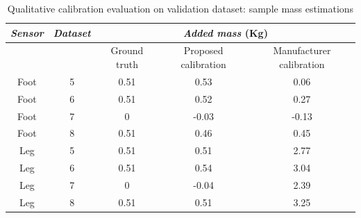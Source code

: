 \begin{table}[ht] 
\caption{Qualitative calibration evaluation on validation dataset: sample mass estimations}
\centering 
\begin{tabular}{ | c | c | c | c | c | } 
\hline
              \emph{Sensor}   & \emph{Dataset} & \multicolumn{3}{c|}{\emph{Added mass} (Kg)} \\
\hline \rowcolor[gray]{.9}
\hline \rowcolor[gray]{.9}    &                &  \multicolumn{1}{p{1.6cm}|}{Ground truth} & \multicolumn{1}{p{2cm}|}{Proposed calibration} & \multicolumn{1}{p{2.2cm}|}{Manufacturer calibration}     \\
\hline
  \rowcolor[gray]{.9} Foot    &  5     &  0.51    &  0.53  & 0.06  \\ 
  \rowcolor[gray]{.9} Foot	&  6   &  0.51    &  0.52   &  0.27  \\
  \rowcolor[gray]{.9} Foot	&  7   &  0       & -0.03  &  -0.13 \\
  \rowcolor[gray]{.9}  Foot	&  8   &  0.51    &  0.46  & 0.45 \\
 \hline 
 Leg  &  5    & 0.51  & 0.51 & 2.77  \\ 
 Leg	&  6  & 0.51  & 0.54 & 3.04  \\
 Leg	&  7  & 0     & -0.04  & 2.39  \\
 Leg	&  8  & 0.51  & 0.51  & 3.25  \\
 \hline
 \end{tabular} 
 \label{table:mass} %
 \end{table}

